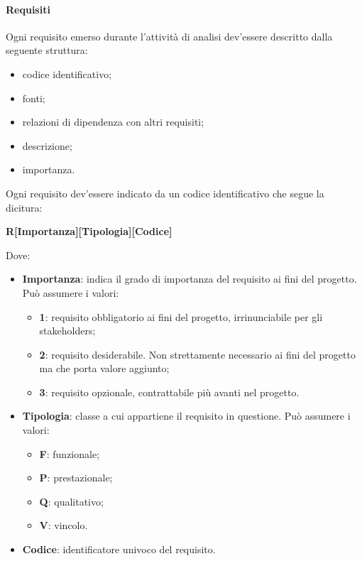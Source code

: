                  \paragraph{Requisiti}
                 Ogni requisito emerso durante l'attività di analisi dev'essere descritto dalla seguente struttura:
                    \begin{itemize}
                    	\item{codice identificativo;}
                     	\item{fonti;} 
                     	\item{relazioni di dipendenza con altri requisiti;}
                      	\item{descrizione;}
                      	\item{importanza.}
                     \end{itemize}
                     
                	Ogni requisito dev'essere indicato da un codice identificativo che segue la dicitura: 
                    \begin{center}
                    \textbf{R[Importanza][Tipologia][Codice]}
                    \end{center}
                    Dove:
                    \begin{itemize}
                        	\item{\textbf{Importanza}: indica il grado di importanza del requisito ai fini del progetto. Può assumere i valori:}
                        	\begin{itemize}
                                	\item{\textbf{1}: requisito obbligatorio ai fini del progetto, irrinunciabile per gli stakeholders;}
                                	\item{\textbf{2}: requisito desiderabile. Non strettamente necessario ai fini del progetto ma che porta valore aggiunto;}
                                	\item{\textbf{3}: requisito opzionale, contrattabile più avanti nel progetto.}
                        	\end{itemize}
                        	\item{\textbf{Tipologia}: classe a cui appartiene il requisito in questione. Può assumere i valori:}
                        	\begin{itemize}
                        		\item{\textbf{F}: funzionale;}
                        		\item{\textbf{P}: prestazionale;}
                        		\item{\textbf{Q}: qualitativo;}
                        		\item{\textbf{V}: vincolo.}
                        	\end{itemize}
                        	\item{\textbf{Codice}: identificatore univoco del requisito}.
                    \end{itemize}
                    

